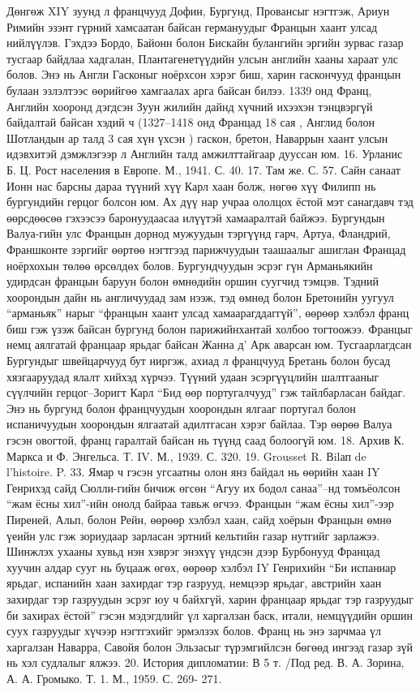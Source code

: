 Дөнгөж XIY зуунд л францчууд Дофин, Бургунд, Провансыг нэгтгэж, Ариун Римийн эзэнт гүрний хамсаатан байсан германуудыг Францын хаант улсад нийлүүлэв. Гэхдээ Бордо, Байонн болон Бискайн булангийн эргийн зурвас газар тусгаар байдлаа хадгалан, Плантагенетүүдийн улсын английн хааны хараат улс болов. Энэ нь Англи Гасконыг ноёрхсон хэрэг биш, харин гаскончууд францын булаан эзлэлтээс өөрийгөө хамгаалах арга байсан билээ.
1339 онд Франц, Английн хооронд дэгдсэн Зуун жилийн дайнд хүчний ихээхэн тэнцвэргүй байдалтай байсан хэдий ч (1327–1418 онд Францад 18 сая , Англид болон Шотландын ар талд 3 сая хүн үхсэн ) гаскон, бретон, Наваррын хаант улсын идэвхитэй дэмжлэгээр л Английн талд амжилттайгаар дууссан юм. 16. Урланис Б. Ц. Рост населения в Европе. М., 1941. С. 40. 17. Там же. С. 57.
Сайн санаат Ионн нас барсны дараа түүний хүү Карл хаан болж, нөгөө хүү Филипп нь бургундийн герцог болсон юм. Ах дүү нар учраа ололцох ёстой мэт санагдавч тэд өөрсдөөсөө гэхээсээ баронуудаасаа илүүтэй хамааралтай байжээ. Бургундын Валуа-гийн улс Францын дорнод мужуудын тэргүүнд гарч, Артуа, Фландрий, Франшконте зэргийг өөртөө нэгтгээд парижчуудын таашаалыг ашиглан Францад ноёрхохын төлөө өрсөлдөх болов. Бургундчуудын эсрэг гүн Арманьякийн удирдсан францын баруун болон өмнөдийн оршин суугчид тэмцэв. Тэдний хоорондын дайн нь англичуудад зам нээж, тэд өмнөд болон Бретонийн уугуул “арманьяк” нарыг “францын хаант улсад хамаарагддаггүй”, өөрөөр хэлбэл франц биш гэж үзэж байсан бургунд болон парижийнхантай холбоо тогтоожээ. Францыг немц аялгатай францаар ярьдаг байсан Жанна д’ Арк аварсан юм. Тусгаарлагдсан Бургундыг швейцарчууд бут ниргэж, ахиад л францчууд Бретань болон бусад хязгааруудад ялалт хийхэд хүрчээ. Түүний удаан эсэргүүцлийн шалтгааныг сүүлчийн герцог–Зоригт Карл “Бид өөр португалчууд” гэж тайлбарласан байдаг. Энэ нь бургунд болон францчуудын хоорондын ялгааг португал болон испаничуудын хоорондын ялгаатай адилтгасан хэрэг байлаа. Тэр өөрөө Валуа гэсэн овогтой, франц гаралтай байсан нь түүнд саад болоогүй юм. 18. Архив К. Маркса и Ф. Энгельса. Т. IV. М., 1939. С. 320. 19. Grousset R. Вilап de l’histoire. P. 33.
Ямар ч гэсэн угсаатны олон янз байдал нь өөрийн хаан IY Генрихэд сайд Сюлли-гийн бичиж өгсөн “Агуу их бодол санаа”–нд томъёолсон “жам ёсны хил”-ийн онолд байраа тавьж өгчээ. Францын “жам ёсны хил”-ээр Пиреней, Альп, болон Рейн, өөрөөр хэлбэл хаан, сайд хоёрын Францын өмнө үеийн улс гэж зориудаар зарласан эртний кельтийн газар нутгийг зарлажээ. Шинжлэх ухааны хувьд нэн хэврэг энэхүү үндсэн дээр Бурбонууд Францад хуучин алдар сууг нь буцааж өгөх, өөрөөр хэлбэл IY Генрихийн “Би испаниар ярьдаг, испанийн хаан захирдаг тэр газрууд, немцээр ярьдаг, австрийн хаан захирдаг тэр газруудын эсрэг юу ч байхгүй, харин францаар ярьдаг тэр газруудыг би захирах ёстой” гэсэн мэдэгдлийг үл харгалзан баск, итали, немцүүдийн оршин суух газруудыг хүчээр нэгтгэхийг эрмэлзэх болов. Франц нь энэ зарчмаа үл харгалзан Наварра, Савойя болон Эльзасыг түрэмгийлсэн бөгөөд ингээд газар зүй нь хэл судлалыг ялжээ. 20. История дипломатии: В 5 т. /Под ред. В. А. Зорина, А. А. Громыко. Т. 1. М., 1959. С. 269- 271.

